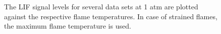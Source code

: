 \begin{figure}

\centering



\caption[LIF signal correlation with flame temperature]{The LIF signal levels for several data sets at 1 atm are plotted against the respective flame temperatures. In case of strained flames, the maximum flame temperature is used.}

\label{fig:temperature-correlation}

\end{figure}
